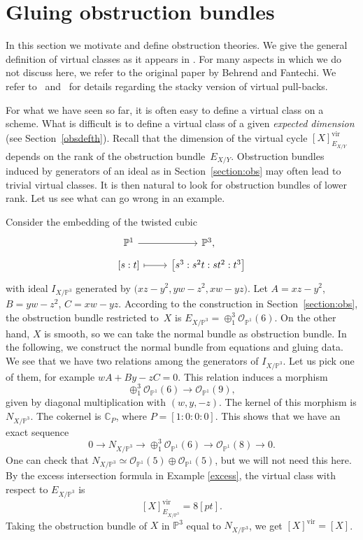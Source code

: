 \documentclass[pdftex]{sigma}
\numberwithin{equation}{section}
\newcommand{\vv}{\mathrm{vir}}
\newcommand{\PP}{\mathbb P}
\begin{document}
\section{Gluing obstruction bundles}\label{gluingobs}
In this section we motivate and define obstruction theories. We give the general definition of virtual classes as it appears in \cite{BerFan}. For many aspects in \cite{BerFan} which we do not discuss here, we refer to the original paper by Behrend and Fantechi. We refer to~\cite{Kstacks} and~\cite{vir-pull} for details regarding the stacky version of virtual pull-backs.

For what we have seen so far, it is often easy to define a virtual class on a scheme. What is difficult is to define a virtual class of a given \emph{expected dimension} (see Section~\ref{obsdefth}). Recall that the dimension of the virtual cycle $[X]_{E_{X/Y}}^{\vv}$ depends on the rank of the obstruction bundle~$E_{X/Y}$. Obstruction bundles induced by generators of an ideal as in Section~\ref{section:obs} may often lead to trivial virtual classes. It is then natural to look for obstruction bundles of lower rank. Let us see what can go wrong in an example.
\begin{Example}
Consider the embedding of the twisted cubic
\[
 \begin{tikzcd}[row sep=tiny]
 \mathbb P^1\ar[r] & \mathbb P^3, \\
 \left[s:t\right]\ar[r, mapsto] & \big[s^3:s^2t:st^2:t^3\big]
 \end{tikzcd}
\]
with ideal $I_{X/\PP^3}$ generated by $\big(xz-y^2,yw-z^2,xw-yz\big)$. Let $A=xz-y^2$, $B=yw-z^2$, $C=xw-yz$. According to the construction in Section~\ref{section:obs}, the obstruction bundle restricted to~$X$ is $E_{X/\PP^3}=\oplus_1^3 \mathcal O_{\PP^1}(6)$. On the other hand, $X$ is smooth, so we can take the normal bundle as obstruction bundle. In the following, we construct the normal bundle from equations and gluing data. We see that we have two relations among the generators of $I_{X/\PP^3}$. Let us pick one of them, for example $wA+By-zC=0$. This relation induces a morphism
\[ \oplus_1^3 \mathcal O_{\PP^1}(6)\to \mathcal O_{\PP^1}(9),
\]
given by diagonal multiplication with $(w,y,-z)$. The kernel of this morphism is $N_{X/\PP^3}$. The cokernel is $\mathbb{C}_P$, where $P=[1:0:0:0]$. This shows that we have an exact sequence
\[
0\to N_{X/\PP^3}\to \oplus_1^3 \mathcal O_{\PP^1}(6)\to \mathcal O_{\PP^1}(8)\to 0.
\]
One can check that $N_{X/\PP^3}\simeq \mathcal O_{\PP^1}(5)\oplus\mathcal O_{\PP^1}(5)$, but we will not need this here. By the excess intersection formula in Example \ref{excess}, the virtual class with respect to $E_{X/\PP^3}$ is
 \[
 [X]^{\vv}_{E_{X/\PP^3}}=8[pt].
 \]
 Taking the obstruction bundle of $X$ in $\PP^3$ equal to $N_{X/\PP^3}$, we get $[X]^{\vv}=[X]$.
\end{Example}
\end{document}
